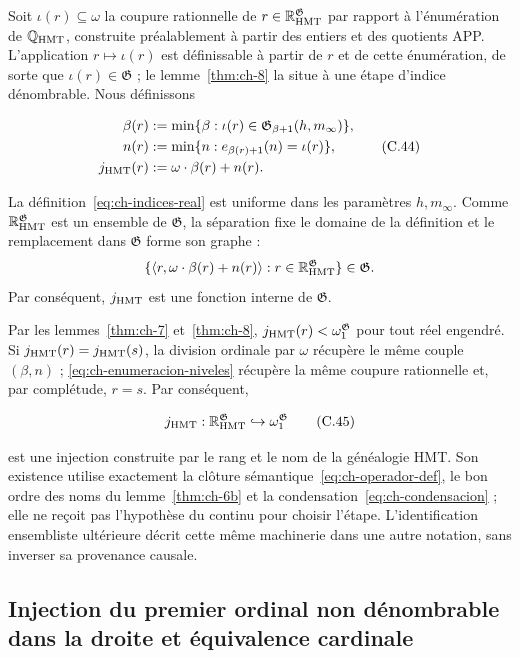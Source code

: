 Soit \(\iota(r)\subseteq\omega\) la coupure rationnelle de
\(r\in\mathbb R_{\rm HMT}^{\mathfrak G}\) par rapport à l’énumération de
\(\mathbb Q_{\rm HMT}\), construite préalablement à partir des entiers et des quotients
APP. L’application \(r\mapsto\iota(r)\) est définissable à partir de \(r\) et de cette énumération,
de sorte que \(\iota(r)\in\mathfrak G\) ; le lemme~\ref{thm:ch-8} la situe à une étape
d’indice dénombrable. Nous définissons

\[
 \begin{aligned}
  \beta(r)&:=\min\{\beta:
       \iota(r)\in\mathfrak G_{\beta+1}(h,m_\infty)\},\\
  n(r)&:=\min\{n:e_{\beta(r)+1}(n)=\iota(r)\},\\
  j_{\rm HMT}(r)&:=\omega\cdot\beta(r)+n(r).
 \end{aligned}
\tag{C.44}\label{eq:ch-indices-real}
\]

La définition~\eqref{eq:ch-indices-real} est uniforme dans les paramètres \(h,m_\infty\). Comme \(\mathbb R_{\rm HMT}^{\mathfrak G}\) est un ensemble de \(\mathfrak G\), la séparation fixe le domaine de la définition et le remplacement dans \(\mathfrak G\) forme son graphe :
\[
 \{\langle r,\omega\cdot\beta(r)+n(r)\rangle:
 r\in\mathbb R_{\rm HMT}^{\mathfrak G}\}\in\mathfrak G.
\]
Par conséquent, \(j_{\rm HMT}\) est une fonction interne de \(\mathfrak G\).

Par les lemmes~\ref{thm:ch-7} et~\ref{thm:ch-8},
\(j_{\rm HMT}(r)<\omega_1^{\mathfrak G}\) pour tout
réel engendré. Si \(j_{\rm HMT}(r)=j_{\rm HMT}(s)\), la division ordinale par
\(\omega\) récupère le même couple \((\beta,n)\) ; \eqref{eq:ch-enumeracion-niveles} récupère la même coupure
rationnelle et, par complétude, \(r=s\). Par conséquent,

\[
 j_{\rm HMT}:\mathbb R_{\rm HMT}^{\mathfrak G}
 \hookrightarrow\omega_1^{\mathfrak G}
\tag{C.45}\label{eq:ch-inyeccion-j}
\]

est une injection construite par le rang et le nom de la généalogie HMT. Son existence utilise exactement la clôture sémantique~\eqref{eq:ch-operador-def}, le bon ordre des noms du lemme~\ref{thm:ch-6b} et la condensation~\eqref{eq:ch-condensacion} ; elle ne reçoit pas l'hypothèse du continu pour choisir l'étape. L'identification ensembliste ultérieure décrit cette même machinerie dans une autre notation, sans inverser sa provenance causale.

\subsection{Injection du premier ordinal non dénombrable dans la droite et équivalence cardinale}

